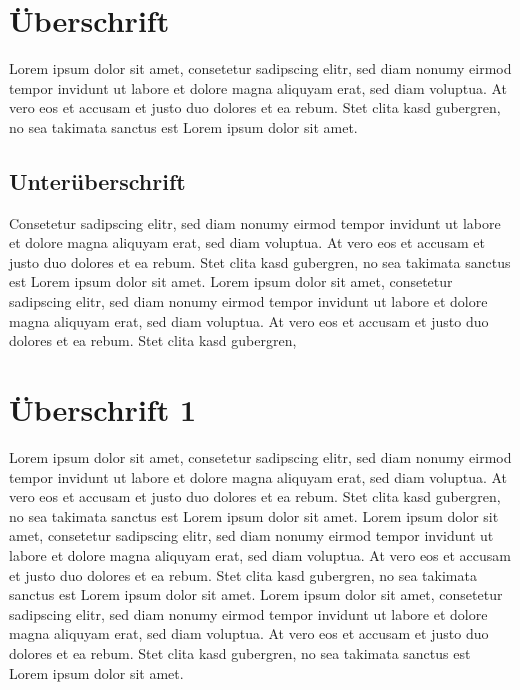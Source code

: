 \section{Überschrift}
Lorem ipsum dolor sit amet, consetetur sadipscing elitr, sed
diam nonumy eirmod tempor invidunt ut labore et dolore
magna aliquyam erat, sed diam voluptua. At vero eos et
accusam et justo duo dolores et ea rebum. Stet clita kasd
gubergren, no sea takimata sanctus est Lorem ipsum dolor
sit amet.
\subsection{Unterüberschrift}
Consetetur sadipscing elitr, sed diam nonumy eirmod
tempor invidunt ut labore et dolore magna aliquyam erat,
sed diam voluptua. At vero eos et accusam et justo duo
dolores et ea rebum. Stet clita kasd gubergren, no sea
takimata sanctus est Lorem ipsum dolor sit amet. Lorem
ipsum dolor sit amet, consetetur sadipscing elitr, sed diam
nonumy eirmod tempor invidunt ut labore et dolore magna
aliquyam erat, sed diam voluptua. At vero eos et accusam
et justo duo dolores et ea rebum. Stet clita kasd gubergren,

\section{Überschrift 1}
Lorem ipsum dolor sit amet, consetetur sadipscing elitr, sed
diam nonumy eirmod tempor invidunt ut labore et dolore
magna aliquyam erat, sed diam voluptua. At vero eos et
accusam et justo duo dolores et ea rebum. Stet clita kasd
gubergren, no sea takimata sanctus est Lorem ipsum dolor
sit amet. Lorem ipsum dolor sit amet, consetetur sadipscing
elitr, sed diam nonumy eirmod tempor invidunt ut labore et
dolore magna aliquyam erat, sed diam voluptua. At vero
eos et accusam et justo duo dolores et ea rebum. Stet clita
kasd gubergren, no sea takimata sanctus est Lorem ipsum
dolor sit amet. Lorem ipsum dolor sit amet, consetetur
sadipscing elitr, sed diam nonumy eirmod tempor invidunt
ut labore et dolore magna aliquyam erat, sed diam
voluptua. At vero eos et accusam et justo duo dolores et ea
rebum. Stet clita kasd gubergren, no sea takimata sanctus
est Lorem ipsum dolor sit amet.




